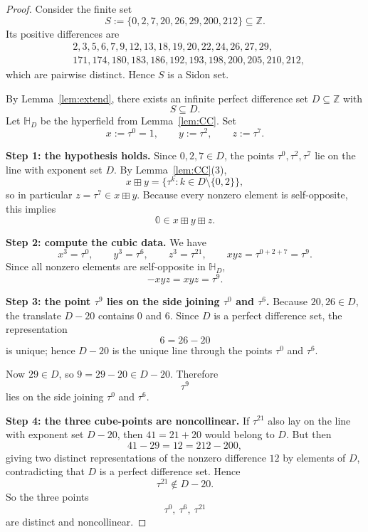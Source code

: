 \documentclass[11pt]{article}
\newcommand{\hz}{\mathbb{0}}
\begin{document}
\begin{proof}
Consider the finite set
\[
S:=\{0,2,7,20,26,29,200,212\}\subseteq \mathbb Z.
\]
Its positive differences are
\[
\begin{aligned}
&2,3,5,6,7,9,12,13,18,19,20,22,24,26,27,29,\\
&171,174,180,183,186,192,193,198,200,205,210,212,
\end{aligned}
\]
which are pairwise distinct. Hence $S$ is a Sidon set.

By Lemma~\ref{lem:extend}, there exists an infinite perfect difference set $D\subseteq \mathbb Z$ with
\[
S\subseteq D.
\]
Let $\mathbb H_D$ be the hyperfield from Lemma~\ref{lem:CC}. Set
\[
x:=\tau^0=1,\qquad y:=\tau^2,\qquad z:=\tau^7.
\]

\medskip

\noindent\textbf{Step 1: the hypothesis holds.}
Since $0,2,7\in D$, the points $\tau^0,\tau^2,\tau^7$ lie on the line with exponent set $D$.
By Lemma~\ref{lem:CC}(3),
\[
x\boxplus y=\{\tau^k:k\in D\setminus\{0,2\}\},
\]
so in particular $z=\tau^7\in x\boxplus y$. Because every nonzero element is self-opposite, this implies
\[
\hz\in x\boxplus y\boxplus z.
\]

\medskip

\noindent\textbf{Step 2: compute the cubic data.}
We have
\[
x^3=\tau^0,\qquad y^3=\tau^6,\qquad z^3=\tau^{21},\qquad xyz=\tau^{0+2+7}=\tau^9.
\]
Since all nonzero elements are self-opposite in $\mathbb H_D$,
\[
-xyz=xyz=\tau^9.
\]

\medskip

\noindent\textbf{Step 3: the point $\tau^9$ lies on the side joining $\tau^0$ and $\tau^6$.}
Because $20,26\in D$, the translate $D-20$ contains $0$ and $6$. Since $D$ is a perfect difference set, the representation
\[
6=26-20
\]
is unique; hence $D-20$ is the unique line through the points $\tau^0$ and $\tau^6$.

Now $29\in D$, so $9=29-20\in D-20$. Therefore
\[
\tau^9
\]
lies on the side joining $\tau^0$ and $\tau^6$.

\medskip

\noindent\textbf{Step 4: the three cube-points are noncollinear.}
If $\tau^{21}$ also lay on the line with exponent set $D-20$, then $41=21+20$ would belong to $D$. But then
\[
41-29=12=212-200,
\]
giving two distinct representations of the nonzero difference $12$ by elements of $D$, contradicting that $D$ is a perfect difference set. Hence
\[
\tau^{21}\notin D-20.
\]
So the three points
\[
\tau^0,\ \tau^6,\ \tau^{21}
\]
are distinct and noncollinear.


\end{proof}
\end{document}
